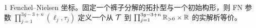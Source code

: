 \begin{thm}{1} Fenchel--Nielsen 坐标。固定一个裤子分解的拓扑型与一个初始构形，则 FN
参数 $\prod_{j=1}^{3g-3+n}(\ell_j,\tau_j)$ 定义一个从 $\mathcal{T}$ 到
$\prod_{j=1}^{3g-3+n}\mathbb{R}_{>0}\times\mathbb{R}$ 的实解析等价。\end{thm}

